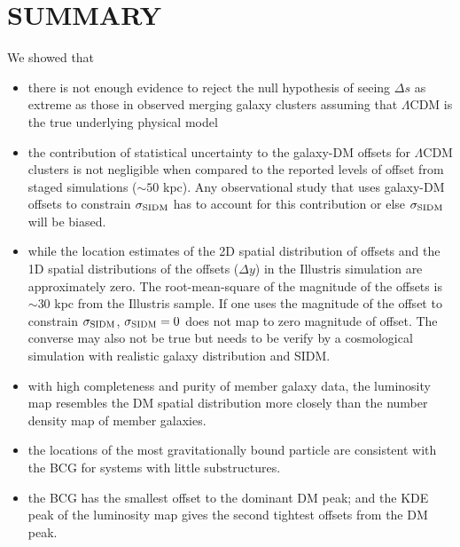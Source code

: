 \section{SUMMARY}
We showed that 
\begin{itemize}
		\item there is not enough evidence 
			 to reject the null hypothesis of
			seeing $\Delta s$ as extreme as those in observed merging galaxy clusters assuming that
			$\Lambda$CDM is the true underlying physical model  \\

		\item the contribution of statistical uncertainty to the galaxy-DM offsets 
			for $\Lambda$CDM clusters is not negligible when compared to the reported
			levels of offset from staged simulations ($\sim 50$ kpc). Any
			observational study that uses 
			galaxy-DM offsets to
			constrain $\sigma_{\rm SIDM}$ has to account for this contribution
			or else $\sigma_{\rm SIDM}$ will be biased. \\

		\item while the location estimates of the 2D spatial distribution of offsets and the
			1D spatial distributions of the offsets ($\Delta y$) in the Illustris
			simulation are approximately zero.
			The root-mean-square of the magnitude of the
			offsets is $\sim 30$ kpc from the Illustris sample. 
			If one uses the magnitude of the offset to constrain
			$\sigma_{\rm SIDM}$, $\sigma_{\rm SIDM} = 0$ 
			does not map to zero magnitude of offset.  
			The converse may also not be true but needs to be verify by a
			cosmological simulation with realistic galaxy distribution and SIDM. 
			\\

		\item with high completeness and purity of member galaxy data, the
			luminosity map resembles the DM spatial distribution more closely than 
			the number density map of member galaxies. \\ 

		\item the locations of the most gravitationally bound particle are consistent 
			with the BCG for systems with little substructures.  \\

		\item the BCG has the smallest offset to the dominant DM peak; and  
			the KDE peak of the luminosity map gives the second tightest 
			offsets from the DM peak. \\


\end{itemize}
